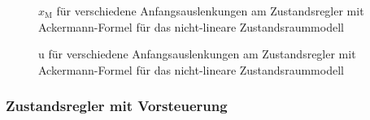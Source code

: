 \documentclass[
	pagesize,
	fontsize=12pt,
	paper=a4,
	oneside,
   reqno
]{scrartcl}
\begin{document}
\begin{figure}[H]
    \centering
    \caption[$x_{\mathrm{M}}$ für Regler mit Ackermann-Formel (nicht-linear)]{$x_{\mathrm{M}}$ für verschiedene Anfangsauslenkungen am Zustandsregler mit Ackermann-Formel für das nicht-lineare Zustandsraummodell}
    \label{fig:Bild22}
\end{figure}

\begin{figure}[H]
    \centering
    \caption[u für Regler mit Ackermann-Formel (nicht-linear)]{u für verschiedene Anfangsauslenkungen am Zustandsregler mit Ackermann-Formel für das nicht-lineare Zustandsraummodell}
    \label{fig:Bild23}
\end{figure}

\subsubsection{Zustandsregler mit Vorsteuerung}
\end{document}
